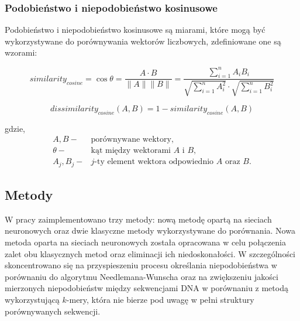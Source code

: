         \subsubsection{Podobieństwo i niepodobieństwo kosinusowe}

            Podobieństwo i niepodobieństwo kosinusowe są miarami, które mogą być wykorzystywane do porównywania wektorów liczbowych, zdefiniowane one są wzorami:

            \begin{equation}
                similarity_{cosine} = \cos{\theta} = \frac{A \cdot B}{\|A\| \|B\|} = \frac{
                        \sum^{n}_{i = 1}A_i B_i
                    }{
                        \sqrt{
                            \sum^{n}_{i = 1}A_i^2
                        }
                        \cdot
                        \sqrt{
                            \sum^{n}_{i = 1}B_i^2
                        }
                    }
            \end{equation}

            \begin{equation}
                dissimilarity_{cosine}(A, B) = 1 - similarity_{cosine}(A, B)
            \end{equation}

            gdzie,
            \begin{align*} 
                A, B -& \text{porównywane wektory}, \\
                \theta -& \text{kąt między wektorami $A$ i $B$}, \\
                A_j, B_j -& \text{$j$-ty element wektora odpowiednio $A$ oraz $B$}.
            \end{align*}


    \subsection{Metody}
    
            W pracy zaimplementowano trzy metody: nową metodę opartą na sieciach neuronowych oraz dwie klasyczne metody wykorzystywane do porównania. Nowa metoda oparta na sieciach neuronowych została opracowana w celu połączenia zalet obu klasycznych metod oraz eliminacji ich niedoskonałości. W szczególności skoncentrowano się na przyspieszeniu procesu określania niepodobieństwa w porównaniu do algorytmu Needlemana-Wunscha oraz na zwiększeniu jakości mierzonych niepodobieństw między sekwencjami DNA w porównaniu z metodą wykorzystującą $k$-mery, która nie bierze pod uwagę w pełni struktury porównywanych sekwencji.
    
